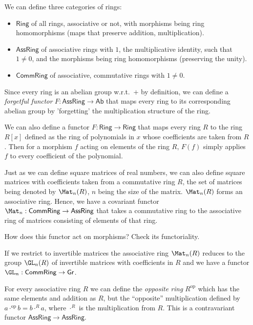 We can define three categories of rings:
\begin{itemize}
    \item $\mathsf{Ring}$ of all rings, associative or not, with morphisms
    being ring homomorphisms (maps that preserve addition, multiplication).
    \item $\mathsf{AssRing}$ of associative rings with $1$, the multiplicative
    identity, such that $1\neq0$, and the morphisms being ring homomorphisms
    (preserving the unity).
    \item $\mathsf{CommRing}$ of associative, commutative rings with $1\neq0$. 
\end{itemize}
\begin{example}
    Since every ring is an abelian group w.r.t.\ $+$ by definition,
    we can define a \emph{forgetful functor} $F:\mathsf{AssRing}\rightarrow\mathsf{Ab}$
    that maps every ring to its corresponding abelian group by 'forgetting'
    the multiplication structure of the ring.
\end{example}
%
\begin{example}
    We can also define a functor $F:\mathsf{Ring}\rightarrow\mathsf{Ring}$
    that maps every ring $R$ to the ring $R[x]$ defined as the ring
    of polynomials in $x$ whose coefficients are taken from $R$. Then
    for a morphism $f$ acting on elements of the ring $R$, $F\left(f\right)$
    simply applies $f$ to every coefficient of the polynomial.
\end{example}
%
\begin{example}
    Just as we can define square matrices of real numbers, we can also
    define square matrices with coefficients taken from a commutative
    ring $R$, the set of matrices being denoted by $\Mat_n(R)$,
    $n$ being the size of the matrix. $\Mat_n(R)$ forms an associative
    ring. Hence, we have a covariant functor $\Mat_n:\mathsf{CommRing}\rightarrow\mathsf{AssRing}$
    that takes a commutative ring to the associative ring of matrices consisting of elements of that ring. 
\end{example}
\begin{xca}
    How does this functor act on morphisms? Check its functoriality.
\end{xca}
\begin{example}
    If we restrict to invertible matrices the associative ring $\Mat_n(R)$
    reduces to the group $\GL_n(R)$ of invertible matrices with
    coefficients in $R$ and we have a functor $\GL_n:\mathsf{CommRing}\rightarrow\mathsf{Gr}$.
\end{example}
%
\begin{example}
    For every associative ring $R$ we can define the \emph{opposite
    ring} $R^{\mathrm{op}}$ which has the same elements and addition as
    $R$, but the ``opposite'' multiplication defined by $a\cdot^{\mathrm{op}}b=b\cdot^{R}a$,
    where $\cdot^{R}$ is the multiplication from $R$. This is a contravariant
    functor $\mathsf{AssRing}\to\mathsf{AssRing}$.
\end{example}

